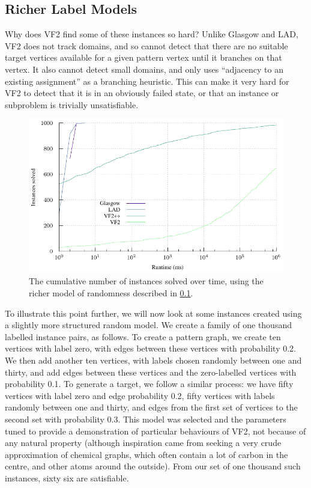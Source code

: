 \documentclass[twoside,11pt]{article}
\begin{document}
\subsection{Richer Label Models}\label{subsection:richer-labels}

Why does VF2 find some of these instances so hard? Unlike Glasgow and LAD, VF2 does not track
domains, and so cannot detect that there are no suitable target vertices available for a given
pattern vertex until it branches on that vertex.  It also cannot detect small domains, and only uses
``adjacency to an existing assignment'' as a branching heuristic. This can make it very hard for VF2
to detect that it is in an obviously failed state, or that an instance or subproblem is trivially
unsatisfiable.

\begin{figure}[t]
    \centering
    \includegraphics*{plots/skewed.pdf}

    \caption{The cumulative number of instances solved over time, using the richer model of
    randomness described in \cref{subsection:richer-labels}.}
    \label{figure:skewed-cumulative}
\end{figure}

To illustrate this point further, we will now look at some instances created using a slightly more
structured random model. We create a family of one thousand labelled instance pairs, as follows. To
create a pattern graph, we create ten vertices with label zero, with edges between these vertices
with probability 0.2. We then add another ten vertices, with labels chosen randomly between one and
thirty, and add edges between these vertices and the zero-labelled vertices with probability 0.1.
To generate a target, we follow a similar process: we have fifty vertices with label zero and edge
probability 0.2, fifty vertices with labels randomly between one and thirty, and edges from the
first set of vertices to the second set with probability 0.3.  This model was selected and the
parameters tuned to provide a demonstration of particular behaviours of VF2, not because of any natural
property (although inspiration came from seeking a very crude approximation of chemical graphs,
which often contain a lot of carbon in the centre, and other atoms around the outside). From our set
of one thousand such instances, sixty six are satisfiable.
\end{document}
